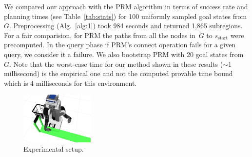 \documentclass[letterpaper, 10 pt, conference]{ieeeconf}  %
\begin{document}
We compared our approach with the \textsf{PRM} algorithm in terms of success rate and planning times (see Table~\ref{tab:stats}) for 100 uniformly sampled goal states from $G$. 
Preprocessing (Alg.~\ref{alg:1}) took 984 seconds and returned 1,865 subregions. For a fair comparision, for \textsf{PRM} the paths from all the nodes in~$G$ to $s_{\text{start}}$ were precomputed. 
In the query phase if \textsf{PRM}'s connect operation fails for a given query, we consider it a failure. 
We also bootstrap \textsf{PRM} with 20 goal states from~$G$. Note that the worst-case time for our method shown in these results ($\sim$1 millisecond) is the empirical one and not the computed provable time bound which is 4 milliseconds for this environment.


\begin{figure}[tb]
  \centering
    \includegraphics[width=0.325\textwidth]{simulation2.png}
  \caption{
  Experimental setup.
}
    \label{fig:sim}
 \vspace{-5mm}
\end{figure}



%



\end{document}
